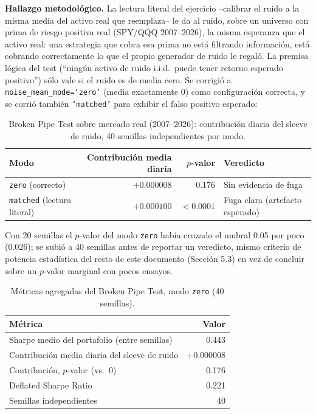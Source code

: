 \documentclass[11pt,a4paper]{article}
\begin{document}
\textbf{Hallazgo metodológico.} La lectura literal del ejercicio --calibrar el ruido a la
misma media del activo real que reemplaza-- le da al ruido, sobre un universo con prima de
riesgo positiva real (SPY/QQQ 2007--2026), la misma esperanza que el activo real: una
estrategia que cobra esa prima no está filtrando información, está cobrando correctamente
lo que el propio generador de ruido le regaló. La premisa lógica del test (``ningún activo
de ruido i.i.d.\ puede tener retorno esperado positivo'') sólo vale si el ruido es de media
cero. Se corrigió a \texttt{noise\_mean\_mode=`zero'} (media exactamente 0) como
configuración correcta, y se corrió también \texttt{`matched'} para exhibir el falso
positivo esperado:

\begin{table}[H]
\centering
\caption{Broken Pipe Test sobre mercado real (2007--2026): contribución diaria del sleeve de ruido, 40 semillas independientes por modo.}
\label{tab:brokenpipe-modes}
\begin{tabular}{lrrl}
\toprule
\textbf{Modo} & \textbf{Contribución media diaria} & \textbf{$p$-valor} & \textbf{Veredicto} \\
\midrule
\texttt{zero} (correcto) & $+0.000008$ & 0.176 & Sin evidencia de fuga \\
\texttt{matched} (lectura literal) & $+0.000100$ & $<0.0001$ & Fuga clara (artefacto esperado) \\
\bottomrule
\end{tabular}
\end{table}

Con 20 semillas el $p$-valor del modo \texttt{zero} había cruzado el umbral 0.05 por poco
(0.026); se subió a 40 semillas antes de reportar un veredicto, mismo criterio de potencia
estadística del resto de este documento (Sección 5.3) en vez de concluir sobre un
$p$-valor marginal con pocos ensayos.

\begin{table}[H]
\centering
\caption{Métricas agregadas del Broken Pipe Test, modo \texttt{zero} (40 semillas).}
\label{tab:brokenpipe-metrics}
\begin{tabular}{lr}
\toprule
\textbf{Métrica} & \textbf{Valor} \\
\midrule
Sharpe medio del portafolio (entre semillas) & 0.443 \\
Contribución media diaria del sleeve de ruido & $+0.000008$ \\
Contribución, $p$-valor (vs.\ 0) & 0.176 \\
Deflated Sharpe Ratio & 0.221 \\
Semillas independientes & 40 \\
\bottomrule
\end{tabular}
\end{table}
\end{document}
